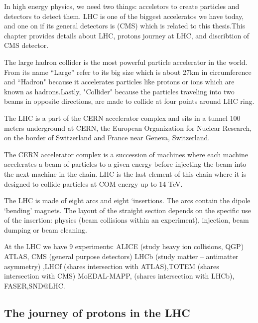 

In high	energy physics, we need two things: acceletors to create particles and detectors to detect them. LHC is one of the biggest acceleratos we have today, and one on if its general detectors is (CMS) which is related to this thesis.This chapter provides details about LHC, protons journey at LHC, and discribtion of CMS detector.   


The large hadron collider is the most powerful particle accelerator in the world. From its name “Large” refer to its big size which is about 27km in circumference and “Hadron" because it accelerates particles like protons or ions which are known as hadrons.Lastly, "Collider" because the particles traveling into two beams in opposite directions, are made to collide at four points around LHC ring.

The LHC is a part of the CERN accelerator complex and sits in a tunnel 100 meters underground at CERN, the European Organization for Nuclear Research, on the border of Switzerland and France near Geneva, Switzerland.

The CERN accelerator complex is a succession of machines where each machine accelerates a beam of particles to a given energy before injecting the beam into the next machine in the chain. LHC is the last element of this chain where it is designed to collide particles at COM energy up to 14 TeV.

The LHC is made of eight arcs and eight ‘insertions. The arcs contain the dipole ‘bending’ magnets. The layout of the straight section depends on the specific use of the insertion: physics (beam collisions within an experiment), injection, beam dumping or beam cleaning.

At the LHC we have 9 experiments:
ALICE (study heavy ion collisions, QGP) ATLAS, CMS  (general purpose detectors) LHCb (study matter – antimatter asymmetry) ,LHCf (shares intersection with ATLAS),TOTEM (shares intersection with CMS) MoEDAL-MAPP, (shares intersection with LHCb), FASER,SND@LHC.

\subsection{The journey of protons in the LHC}


